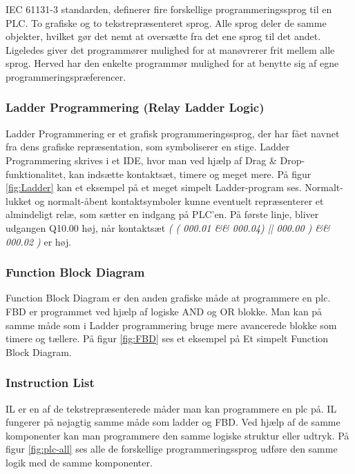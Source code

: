 \noindent IEC 61131-3 standarden, definerer fire forskellige programmeringssprog til en PLC. To grafiske og to tekstrepræsenteret sprog. Alle sprog deler de samme objekter, hvilket gør det nemt at oversætte fra det ene sprog til det andet. Ligeledes giver det programmører mulighed for at manøvrerer frit mellem alle sprog. Herved har den enkelte programmør mulighed for at benytte sig af egne programmeringspræferencer.

\subsubsection{Ladder Programmering (Relay Ladder Logic)}
Ladder Programmering er et grafisk programmeringssprog, der har fået navnet fra dens grafiske repræsentation, som symboliserer en stige. Ladder Programmering skrives i et IDE, hvor man ved hjælp af Drag \& Drop-funktionalitet, kan indsætte kontaktsæt, timere og meget mere. På figur \ref{fig:Ladder} kan et eksempel på et meget simpelt Ladder-program ses. Normalt-lukket og normalt-åbent kontaktsymboler kunne eventuelt repræsenterer et almindeligt relæ, som sætter en indgang på PLC'en. På første linje, bliver udgangen Q10.00 høj, når kontaktsæt \textit{( ( 000.01 \&\& 000.04) || 000.00 ) \&\& 000.02 )} er høj.


\subsubsection{Function Block Diagram}
Function Block Diagram er den anden grafiske måde at programmere en plc. FBD er programmet ved hjælp af logiske AND og OR blokke. Man kan på samme måde som i Ladder programmering bruge mere avancerede blokke som timere og tællere. På figur \ref{fig:FBD} ses et eksempel på Et simpelt Function Block Diagram.




\subsubsection{Instruction List}
IL er en af de tekstrepræsenterede måder man kan programmere en plc på. IL fungerer på nøjagtig samme måde som ladder og FBD. Ved hjælp af de samme komponenter kan man programmere den samme logiske struktur eller udtryk. På figur \ref{fig:plc-all} ses alle de forskellige programmeringssprog udføre den samme logik med de samme komponenter.

